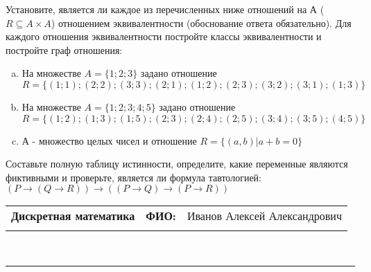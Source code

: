 \documentclass[10pt]{exam}
\newcommand{\class}{Дискретная математика}
\newcommand{\examdate}{}
\begin{document}
\begin{questions}
\question
Установите, является ли каждое из перечисленных ниже отношений на А ($R \subseteq A \times A$) отношением эквивалентности (обоснование ответа обязательно). Для каждого отношения эквивалентности постройте классы 
эквивалентности и постройте граф отношения:
\begin{enumerate} [a)]\setcounter{enumi}{0}
\item На множестве $A = \{1; 2; 3\}$ задано отношение $R = \{(1; 1); (2; 2); (3; 3); (2; 1); (1; 2); (2; 3); (3; 2); (3; 1); (1; 3)\}$
\item На множестве $A = \{1; 2; 3; 4; 5\}$ задано отношение $R = \{(1; 2); (1; 3); (1; 5); (2; 3); (2; 4); (2; 5); (3; 4); (3; 5); (4; 5)\}$
\item А - множество целых чисел и отношение $R = \{(a,b)|a + b = 0\}$
\end{enumerate}\question Составьте полную таблицу истинности, определите, какие переменные являются фиктивными и проверьте, является ли формула тавтологией:
$(P \rightarrow (Q \rightarrow R)) \rightarrow ((P \rightarrow Q) \rightarrow (P \rightarrow R))$

\end{questions}
\newpage
\begin{flushright}
\begin{tabular}{p{2.8in} r l}
\textbf{\class} & \textbf{ФИО:} &Иванов Алексей Александрович
\\

\textbf{\examdate} &&\\
\end{tabular}\\
\end{flushright}
\rule[1ex]{\textwidth}{.1pt}
\end{document}
